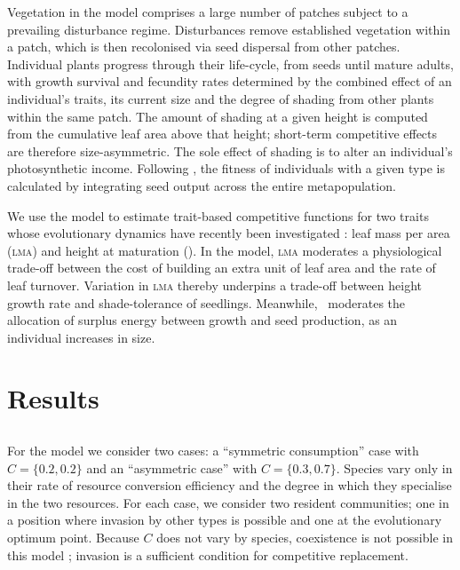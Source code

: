 \documentclass[a4paper,11pt]{article}
\begin{document}
Vegetation in the \plant model comprises a large number of patches subject
to a prevailing disturbance regime.  Disturbances remove established
vegetation within a patch, which is then recolonised via seed
dispersal from other patches.  Individual plants progress through
their life-cycle, from seeds until mature adults, with growth survival
and fecundity rates determined by the combined effect of an
individual's traits, its current size and the degree of shading from
other plants within the same patch. The amount of shading at a given
height is computed from the cumulative leaf area above that height;
short-term competitive effects are therefore size-asymmetric. The sole
effect of shading is to alter an individual's photosynthetic
income. Following \citep{Falster-2015}, the fitness of individuals
with a given type is calculated by integrating seed output across the
entire metapopulation.

We use the \plant model to estimate trait-based competitive functions
for two traits whose evolutionary dynamics have recently been
investigated \citep{Falster-2015}: leaf mass per area (\textsc{lma})
and height at maturation (\hmat). In the model, \textsc{lma} moderates
a physiological trade-off between the cost of building an extra unit
of leaf area and the rate of leaf turnover.  Variation in \textsc{lma}
thereby underpins a trade-off between height growth rate and
shade-tolerance of seedlings. Meanwhile, \hmat\ moderates the
allocation of surplus energy between growth and seed production, as an
individual increases in size.


\section{Results}

%

\subsection{\Rstar}

For the \Rstar model we consider two cases: a ``symmetric
consumption'' case with $C = \{0.2, 0.2\}$ and an ``asymmetric case''
with $C = \{0.3, 0.7\}$.  Species vary only in their rate of resource
conversion efficiency and the degree in which they specialise in the
two resources.  For each case, we consider two resident communities;
one in a position where invasion by other types is possible and one at
the evolutionary optimum point.
%
Because $C$ does not vary by species, coexistence is not possible in
this model \citep{Tilman-1982}; invasion is a sufficient condition for
competitive replacement.
\end{document}
